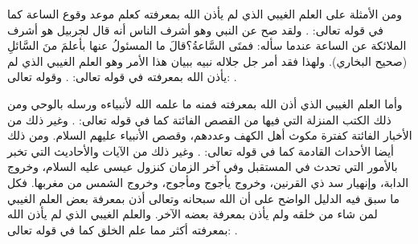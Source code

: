 ومن الأمثلة على العلم الغيبي الذي لم يأذن الله بمعرفته كعلم موعد وقوع الساعة كما في قوله تعالى: 
\quranayah*[33][63]{\footnotesize \surahname*[33]}.
ولقد صح عن النبي وهو أشرف الناس أنه قال لجربيل هو أشرف الملائكة عن الساعة عندما سأله: فمتَى السَّاعةُ؟قالَ ما المسئولُ عنها بأعلمَ منَ السَّائلِ {\footnotesize (صحيح البخاري)}. ولهذا فقد أمر جل جلاله نبيه ببيان هذا الأمر وهو العلم الغيبي الذي لم يأذن الله بمعرفته في قوله تعالى:
\quranayah*[6][50]{\footnotesize \surahname*[6]}. وقوله تعالى:
\quranayah*[7][188]{\footnotesize \surahname*[7]}.

وأما العلم الغيبي الذي أذن الله بمعرفته فمنه ما علمه الله لأنبياءه ورسله بالوحي ومن ذلك الكتب المنزلة التي فيها من القصص الفائتة كما في قوله تعالى:
\quranayah*[11][49]{\footnotesize \surahname*[11]}. وغير ذلك من الأخبار الفائتة كفترة مكوث أهل الكهف وعددهم، وقصص الأنبياء عليهم السلام. ومن ذلك أيضا الأحداث القادمة كما في قوله تعالى:
\quranayah*[34][3]{\footnotesize \surahname*[34]}. وغير ذلك من الآيات والأحاديث التي تخبر بالأمور التي تحدث في المستقبل وفي آخر الزمان كنزول عيسى عليه السلام، وخروج الدابة، وإنهيار سد ذي القرنين، وخروج يأجوج ومأجوج، وخروج الشمس من مغربها. فكل ما سبق فيه الدليل الواضح على أن الله سبحانه وتعالى أذن بمعرفة بعض العلم الغيبي لمن شاء من خلقه ولم يأذن بمعرفة بعضه الآخر. والعلم الغيبي الذي لم يأذن الله بمعرفته أكثر مما علم الخلق كما في قوله تعالى: 
\quranayah*[17][85][9]{\footnotesize \surahname*[17]}. 

